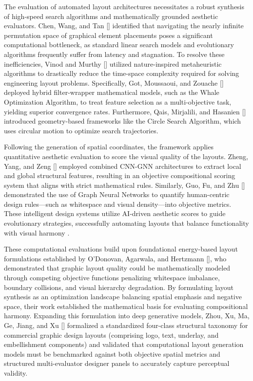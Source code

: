 \begin{refsection}
The evaluation of automated layout architectures necessitates a robust synthesis of high-speed search algorithms and mathematically grounded aesthetic evaluators. Chen, Wang, and Tan [\citeyear{Chen2021Differential}] identified that navigating the nearly infinite permutation space of graphical element placements poses a significant computational bottleneck, as standard linear search models and evolutionary algorithms frequently suffer from latency and stagnation. To resolve these inefficiencies, Vinod and Murthy [\citeyear{Vinod2022Nature}] utilized nature-inspired metaheuristic algorithms to drastically reduce the time-space complexity required for solving engineering layout problems. Specifically, Got, Moussaoui, and Zouache [\citeyear{Got2021Hybrid}] deployed hybrid filter-wrapper mathematical models, such as the Whale Optimization Algorithm, to treat feature selection as a multi-objective task, yielding superior convergence rates. Furthermore, Qais, Mirjalili, and Hasanien [\citeyear{Qais2022Circle}] introduced geometry-based frameworks like the Circle Search Algorithm, which uses circular motion to optimize search trajectories.

Following the generation of spatial coordinates, the framework applies quantitative aesthetic evaluation to score the visual quality of the layouts. Zheng, Yang, and Zeng [\citeyear{Zheng2025Interior}] employed combined CNN-GNN architectures to extract local and global structural features, resulting in an objective compositional scoring system that aligns with strict mathematical rules. Similarly, Guo, Fu, and Zhu [\citeyear{Guo2025Aesthetic}] demonstrated the use of Graph Neural Networks to quantify human-centric design rules—such as whitespace and visual density—into objective metrics. These intelligent design systems utilize AI-driven aesthetic scores to guide evolutionary strategies, successfully automating layouts that balance functionality with visual harmony \cite{zhang2025intelligent}. 


These computational evaluations build upon foundational energy-based layout formulations established by O'Donovan, Agarwala, and Hertzmann [\citeyear{ODonovan2014Layouts}], who demonstrated that graphic layout quality could be mathematically modeled through competing objective functions penalizing whitespace imbalance, boundary collisions, and visual hierarchy degradation. By formulating layout synthesis as an optimization landscape balancing spatial emphasis and negative space, their work established the mathematical basis for evaluating compositional harmony. Expanding this formulation into deep generative models, Zhou, Xu, Ma, Ge, Jiang, and Xu [\citeyear{zhou2022cglgan}] formalized a standardized four-class structural taxonomy for commercial graphic design layouts (comprising logo, text, underlay, and embellishment components) and validated that computational layout generation models must be benchmarked against both objective spatial metrics and structured multi-evaluator designer panels to accurately capture perceptual validity.



\end{refsection}
